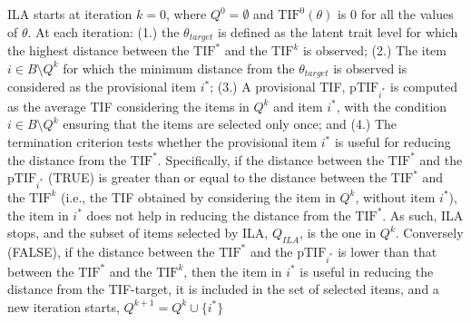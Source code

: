 \documentclass[12pt, a4paper, titilepage]{article}
\begin{document}
ILA starts at iteration $k=0$, where $Q^0 = \emptyset$ and $\text{TIF}^0(\theta)$ is 0 for all the values of $\theta$. 
At each iteration: (1.) the $\theta_{target}$ is defined as the latent trait level for which the highest distance between the $\text{TIF}^*$ and the $\text{TIF}^k$ is observed; (2.) The item $i \in B\setminus Q^k$ for which the minimum distance from the $\theta_{target}$ is observed is considered as the provisional item $i^*$; (3.) A provisional TIF, $\text{pTIF}_{i^*}$ is computed as the average TIF considering the items in $Q^k$ and item $i^*$, with the condition $i \in B\setminus Q^k$ ensuring that the items are selected only once; and (4.)
The termination criterion tests whether the provisional item $i^*$ is useful for reducing the distance from the $\text{TIF}^*$. Specifically, if the distance between the $\text{TIF}^*$ and the $\text{pTIF}_{i^*}$ (TRUE) is greater than or equal to the distance between the $\text{TIF}^*$ and the $\text{TIF}^k$ (i.e., the TIF obtained by considering the item in $Q^k$, without item $i^*$), the item in $i^*$ does not help in reducing the distance from the $\text{TIF}^*$. As such, ILA stops, and  the subset of items selected by ILA, $Q_{ILA}$, is the one in $Q^k$. 
Conversely (FALSE), if the distance between the $\text{TIF}^*$ and the $\text{pTIF}_{i^*}$ is lower than that between the $\text{TIF}^*$ and the $\text{TIF}^k$, then the item in $i^*$ is useful in reducing the distance from the TIF-target, it is included in the set of selected items, and a new iteration starts, $Q^{k+1} = Q^k \cup \{i^*\}$

\end{document}
